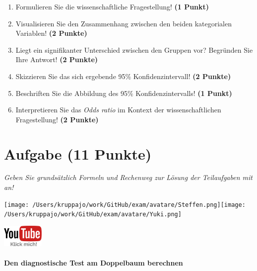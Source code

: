 \documentclass[a4paper, 9pt]{scrartcl}\usepackage[]{graphicx}\usepackage[]{xcolor}
\begin{document}
\begin{enumerate}
\item Formulieren Sie die wissenschaftliche Fragestellung! \textbf{(1 Punkt)}
\item Visualisieren Sie den Zusammenhang zwischen den beiden kategorialen Variablen! \textbf{(2 Punkte)}
\item Liegt ein signifikanter Unterschied zwischen den Gruppen vor? Begründen Sie Ihre Antwort! \textbf{(2 Punkte)}
\item Skizzieren Sie das sich ergebende 95\% Konfidenzintervall! \textbf{(2 Punkte)}
\item Beschriften Sie die Abbildung des 95\% Konfidenzintervalls! \textbf{(1 Punkt)} 
\item Interpretieren Sie das \textit{Odds ratio} im Kontext der wissenschaftlichen Fragestellung! \textbf{(2 Punkte)} 
\end{enumerate}
 
\clearpage

\section{Aufgabe \hfill (11 Punkte)}

\textit{Geben Sie grundsätzlich Formeln und Rechenweg zur Lösung der Teilaufgaben mit an!} \\[1Ex]
 

 
\begin{minipage}[t]{0.5\textwidth}
\texttt{[image: /Users/kruppajo/work/GitHub/exam/avatare/Steffen.png]}\hspace{-4mm}\texttt{[image: /Users/kruppajo/work/GitHub/exam/avatare/Yuki.png]}
\end{minipage}
\begin{minipage}[t]{0.5\textwidth}
\hfill
\href{https://youtu.be/VQlNl8hvRII}{\includegraphics[width = 2cm]{img/youtube}}
\end{minipage}



\paragraph{Den diagnostische Test am Doppelbaum berechnen}
\end{document}
